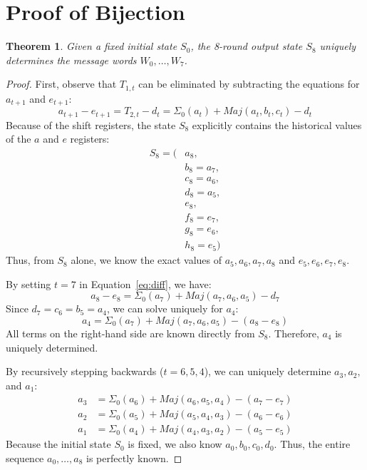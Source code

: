 \documentclass[11pt,a4paper]{article}
\newtheorem{theorem}{Theorem}
\begin{document}
\section{Proof of Bijection}
\begin{theorem}
Given a fixed initial state $S_0$, the 8-round output state $S_8$ uniquely determines the message words $W_0, \dots, W_7$.
\end{theorem}
\begin{proof}
First, observe that $T_{1,t}$ can be eliminated by subtracting the equations for $a_{t+1}$ and $e_{t+1}$:
\begin{equation}
    a_{t+1} - e_{t+1} = T_{2,t} - d_t = \Sigma_0(a_t) + Maj(a_t, b_t, c_t) - d_t \label{eq:diff}
\end{equation}
Because of the shift registers, the state $S_8$ explicitly contains the historical values of the $a$ and $e$ registers:
\begin{align*}
    S_8 = (&a_8, \\
           &b_8 = a_7, \\
           &c_8 = a_6, \\
           &d_8 = a_5, \\
           &e_8, \\
           &f_8 = e_7, \\
           &g_8 = e_6, \\
           &h_8 = e_5)
\end{align*}
Thus, from $S_8$ alone, we know the exact values of $a_5, a_6, a_7, a_8$ and $e_5, e_6, e_7, e_8$. 

By setting $t=7$ in Equation~\ref{eq:diff}, we have:
\begin{equation}
    a_8 - e_8 = \Sigma_0(a_7) + Maj(a_7, a_6, a_5) - d_7
\end{equation}
Since $d_7 = c_6 = b_5 = a_4$, we can solve uniquely for $a_4$:
\begin{equation}
    a_4 = \Sigma_0(a_7) + Maj(a_7, a_6, a_5) - (a_8 - e_8)
\end{equation}
All terms on the right-hand side are known directly from $S_8$. Therefore, $a_4$ is uniquely determined. 

By recursively stepping backwards ($t=6, 5, 4$), we can uniquely determine $a_3, a_2,$ and $a_1$:
\begin{align}
    a_3 &= \Sigma_0(a_6) + Maj(a_6, a_5, a_4) - (a_7 - e_7) \\
    a_2 &= \Sigma_0(a_5) + Maj(a_5, a_4, a_3) - (a_6 - e_6) \\
    a_1 &= \Sigma_0(a_4) + Maj(a_4, a_3, a_2) - (a_5 - e_5)
\end{align}
Because the initial state $S_0$ is fixed, we also know $a_0, b_0, c_0, d_0$. Thus, the entire sequence $a_0, \dots, a_8$ is perfectly known.


\end{proof}
\end{document}
